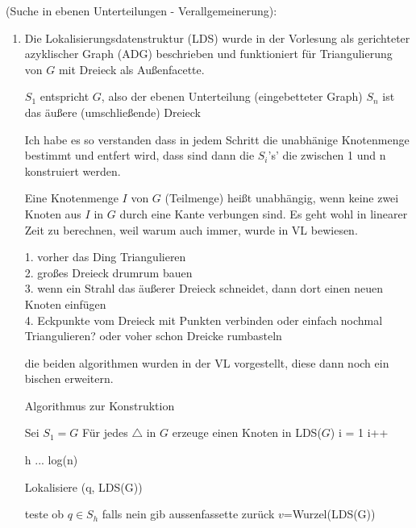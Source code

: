 \documentclass[a4paper, titlepage=false, parskip=full-, 10pt]{scrartcl}
\newcounter{tasknbr}
\newenvironment{task}[1]{{\bf Aufgabe \arabic {tasknbr}\stepcounter{tasknbr}} (#1):\begin{enumerate}}{\end{enumerate}}
\begin{document}
\begin{task}{Suche in ebenen Unterteilungen - Verallgemeinerung}
\item[]

Die Lokalisierungsdatenstruktur (LDS) wurde in der Vorlesung als gerichteter azyklischer Graph (ADG) beschrieben und funktioniert für Triangulierung von $G$ mit Dreieck als Außenfacette.

$S_1$ entspricht $G$, also der ebenen Unterteilung  (eingebetteter Graph)
$S_n$ ist das äußere (umschließende) Dreieck

Ich habe es so verstanden dass in jedem Schritt die unabhänige Knotenmenge bestimmt und entfert wird, dass sind dann die $S_i$'s' die zwischen 1 und n konstruiert werden.

Eine Knotenmenge $I$ von $G$ (Teilmenge) heißt unabhängig, wenn keine zwei Knoten aus $I$ in $G$ durch eine Kante verbungen sind. Es geht wohl in linearer Zeit zu berechnen, weil warum auch immer, wurde in VL bewiesen.




1. vorher das Ding Triangulieren\\
2. großes Dreieck drumrum bauen\\
3. wenn ein Strahl das äußerer Dreieck schneidet, dann dort einen neuen Knoten einfügen\\
4. Eckpunkte vom Dreieck mit Punkten verbinden oder einfach nochmal Triangulieren? oder voher schon Dreicke rumbasteln

die beiden algorithmen wurden in der VL vorgestellt, diese dann noch ein bischen erweitern.

\begin{algorithm}
\caption{Algorithmus zur Konstruktion}
\begin{algorithmic}[1]
\STATE Sei $S_1=G$
\STATE Für jedes $\triangle$ in $G$ erzeuge einen Knoten in LDS($G$)
\STATE i = 1
    \STATE i++
\ENDWHILE
\end{algorithmic}
\end{algorithm}


h ... log(n)

\begin{algorithm}
\caption{Lokalisiere (q, LDS(G))}
\begin{algorithmic}[1]
\STATE teste ob $q \in S_h$ falls nein gib aussenfassette zurück
\STATE $v$=Wurzel(LDS(G))
\ENDWHILE
\end{algorithmic}
\end{algorithm}


\end{task}
\end{document}
